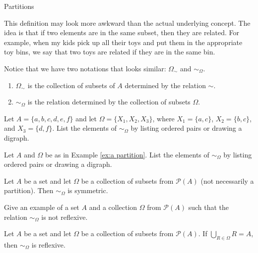 \begin{section}{Partitions}
\begin{remark}
This definition may look more awkward than the actual underlying concept.  The idea is that if two elements are in the same subset, then they are related.  For example, when my kids pick up all their toys and put them in the appropriate toy bins, we say that two toys are related if they are in the same bin.
\end{remark}

\begin{remark}
Notice that we have two notations that looks similar: $\Omega_{\sim}$ and $\sim_{\Omega}$.  
\begin{enumerate}
\item $\Omega_{\sim}$ is the collection of subsets of $A$ determined by the relation $\sim$.
\item $\sim_{\Omega}$ is the relation determined by the collection of subsets $\Omega$.
\end{enumerate}
\end{remark}

\begin{exercise}
Let $A=\{a,b,c,d,e,f\}$ and let $\Omega=\{X_{1},X_{2},X_{3}\}$, where $X_{1}=\{a,c\}$, $X_{2}=\{b,c\}$, and $X_{3}=\{d,f\}$.  List the elements of $\sim_{\Omega}$ by listing ordered pairs or drawing a digraph.
\end{exercise}

\begin{exercise}
Let $A$ and $\Omega$ be as in Example \ref{ex:a partition}.  List the elements of $\sim_{\Omega}$ by listing ordered pairs or drawing a digraph.
\end{exercise}

\begin{theorem}[*]
Let $A$ be a set and let $\Omega$ be a collection of subsets from $\mathcal{P}(A)$ (not necessarily a partition).  Then $\sim_{\Omega}$ is symmetric.
\end{theorem}

\begin{exercise}
Give an example of a set $A$ and a collection $\Omega$ from $\mathcal{P}(A)$ such that the relation $\sim_{\Omega}$ is not reflexive.
\end{exercise}

\begin{theorem}[*]
Let $A$ be a set and let $\Omega$ be a collection of subsets from $\mathcal{P}(A)$.  If $\displaystyle \bigcup_{R\in\Omega}R=A$, then $\sim_{\Omega}$ is reflexive.
\end{theorem}


\end{section}
